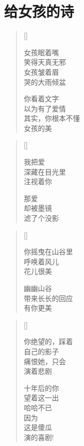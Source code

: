 \chapter{给女孩的诗}
\thispagestyle{empty}
\renewcommand{\poemtoc}{section}
\settowidth{\versewidth}{女孩眠着嘴}
\begin{verse}[\versewidth]

女孩眠着嘴\\
笑得天真无邪\\
女孩皱着眉\\
哭的大雨倾盆

你看着文字\\
以为有了爱情\\
其实，你根本不懂\\
女孩的美
\end{verse}

\settowidth{\versewidth}{女孩眠着嘴}
\begin{verse}[\versewidth]

我把爱\\
深藏在目光里\\
注视着你

那爱\\
却被墨镜\\
滤了个没影
\end{verse}

\settowidth{\versewidth}{女孩眠着嘴}
\begin{verse}[\versewidth]

你摇曳在山谷里\\
呼唤着风儿\\
花儿很美

幽幽山谷\\
带来长长的回应\\
有你更美
\end{verse}
\newpage

\settowidth{\versewidth}{你绝望的，踩着}
\begin{verse}[\versewidth]

你绝望的，踩着\\
自己的影子\\
痛恨她，只会\\
演着悲剧

十年后的你\\
望着这一出\\
哈哈不已\\
因为\\
这是傻瓜\\
演的喜剧!
\end{verse}

